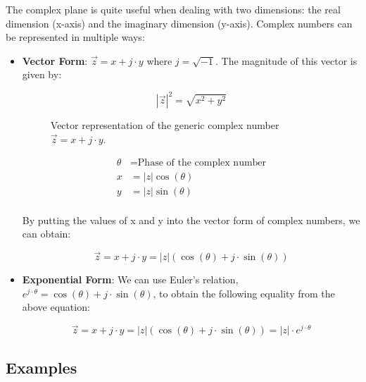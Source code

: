 \documentclass[letterpaper,12pt]{article}
\begin{document}
The complex plane is quite useful when dealing with two dimensions: the real dimension (x-axis) and the imaginary dimension (y-axis). Complex numbers can be represented in multiple ways:
\begin{itemize}
    \item \textbf{Vector Form}: \(\Vec{z} = x + j\cdot y\) where $j=\sqrt{-1}$. The magnitude of this vector is given by:

          \[|\Vec{z}|^2 = \sqrt{x^2 + y^2}\]

          \begin{figure}[!ht]
              \centering
              \caption{Vector representation of the generic complex number \(\Vec{z} = x + j\cdot y\).}\label{fig:signal_vector_graph}
          \end{figure}

          \begin{align*}
              \theta & = \text{Phase of the complex number} \\
              x      & = |z|\cos(\theta)                    \\
              y      & = |z|\sin(\theta)                    \\
          \end{align*}

          By putting the values of x and y into the vector form of complex numbers, we can obtain:

          \[\Vec{z} = x + j\cdot y = |z|(\cos(\theta) + j\cdot \sin(\theta))\]

    \item \textbf{Exponential Form}: We can use Euler's relation, \(e^{j\cdot \theta} = \cos(\theta) + j\cdot \sin(\theta)\), to obtain the following equality from the above equation:

          \begin{equation}
              \label{eq:euler_complex_no}
              \Vec{z} = x + j\cdot y = |z|(\cos(\theta) + j\cdot \sin(\theta)) = |z|\cdot e^{j\cdot \theta}
          \end{equation}


\end{itemize}

\subsection*{Examples}
\end{document}
